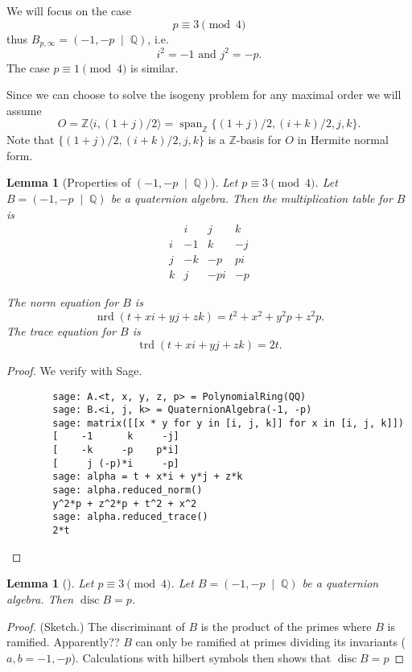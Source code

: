 \documentclass[10pt]{article}
\theoremstyle{plain}
\newtheorem{lemma}[theorem]{Lemma}
\theoremstyle{definition}
\newcommand{\op}{\operatorname}
\newcommand{\Z}{\mathbb{Z}}
\newcommand{\Q}{\mathbb{Q}}
\newcommand{\nrd}{\op{nrd}}
\newcommand{\trd}{\op{trd}}
\newcommand{\disc}{\op{disc}}
\begin{document}
We will focus on the case
\[
    p \equiv 3 \pmod{4}
\]
thus \( B_{p, \infty} = (-1, -p \; \mid \; \Q) \), i.e.
\[
    i^2 = -1 \text{ and } j^2 = -p.
\]
The case \( p \equiv 1 \pmod{4} \) is similar.

Since we can choose to solve the isogeny problem for any maximal order we will assume
\[
    O = \Z \langle i, (1+j) / 2 \rangle = \op{span}_\Z \{ (1+j) / 2, (i+k) / 2 , j, k \}.
\]
Note that \( \{ (1+j) / 2, (i+k) / 2 , j, k \} \) is a \( \Z \)-basis for \( O \) in Hermite normal form.

\begin{lemma}[Properties of \( (-1, -p \; \mid \; \Q) \)]
    Let \( p \equiv 3 \pmod{4} \).
    Let \( B =  (-1, -p \; \mid \; \Q) \) be a quaternion algebra.
    Then the multiplication table for \( B \) is
    \[
        \begin{array}{c|ccc}
              & i  & j   & k  \\
            \hline
            i & -1 & k   & -j \\
            j & -k & -p  & pi \\
            k & j  & -pi & -p
        \end{array}
    \]

    The norm equation for \( B \) is
    \[
        \nrd(t + xi + yj + zk) = t^2 + x^2 + y^2p + z^2p.
    \]
    The trace equation for \( B \) is
    \[
        \trd(t + xi + yj + zk) = 2t.
    \]
\end{lemma}
\begin{proof}
    We verify with Sage.
    \begin{lstlisting}
        sage: A.<t, x, y, z, p> = PolynomialRing(QQ)
        sage: B.<i, j, k> = QuaternionAlgebra(-1, -p)
        sage: matrix([[x * y for y in [i, j, k]] for x in [i, j, k]])
        [    -1      k     -j]
        [    -k     -p    p*i]
        [     j (-p)*i     -p]
        sage: alpha = t + x*i + y*j + z*k
        sage: alpha.reduced_norm()
        y^2*p + z^2*p + t^2 + x^2
        sage: alpha.reduced_trace()
        2*t
    \end{lstlisting}
\end{proof}

\begin{lemma}[]
    Let \( p \equiv 3 \pmod{4} \).
    Let \( B =  (-1, -p \; \mid \; \Q) \) be a quaternion algebra.
    Then \( \disc B = p \).
\end{lemma}
\begin{proof}
    (Sketch.)
    The discriminant of \( B \) is the product of the primes where \( B \) is ramified.
    Apparently?? \( B \) can only be ramified at primes dividing its invariants (\( a, b = -1, -p\)).
    Calculations with hilbert symbols then shows that \( \disc B = p \)
\end{proof}
\end{document}
